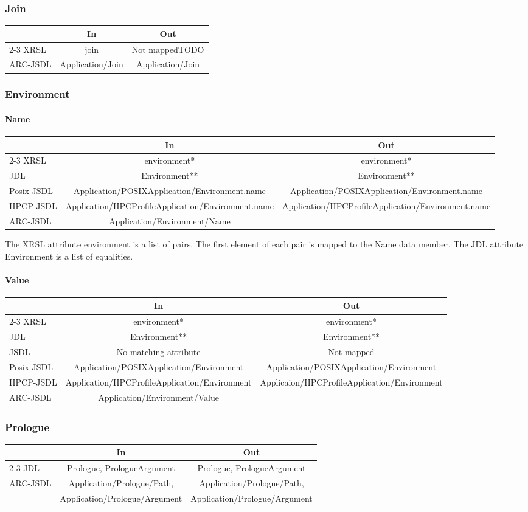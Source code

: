 \documentclass{article}
\newcommand{\todo}{TODO}
\newcommand{\subsubsubsection}[1]{\paragraph{#1}}
\newenvironment{inouttabular}%
{\begin{center}\begin{tabular}{l>{\ttfamily\footnotesize}c>{\ttfamily\footnotesize}c}%
\toprule
& \textnormal{\normalsize{In}} & \textnormal{\normalsize{Out}}\\ \cmidrule{2-3}}
{\bottomrule\end{tabular}\end{center}}
\begin{document}
\subsubsection{Join}
\begin{inouttabular}
XRSL & join & Not mapped\todo{}\\
ARC-JSDL & Application/Join & Application/Join\\
\end{inouttabular}


\subsubsection{Environment}
\subsubsubsection{Name}
\begin{inouttabular}
XRSL & environment* & environment*\\
JDL & Environment** & Environment**\\
Posix-JSDL & Application/POSIXApplication/Environment.name & Application/POSIXApplication/Environment.name\\
HPCP-JSDL & Application/HPCProfileApplication/Environment.name & Application/HPCProfileApplication/Environment.name\\
ARC-JSDL & Application/Environment/Name & ~\\
\end{inouttabular}
The XRSL attribute environment is a list of
pairs. The first element of each pair is mapped to the Name data member.
The JDL attribute Environment is a list of equalities.

\subsubsubsection{Value}
\begin{inouttabular}
XRSL & environment* & environment*\\
JDL & Environment** & Environment**\\
JSDL & No matching attribute & Not mapped\\
Posix-JSDL & Application/POSIXApplication/Environment & Application/POSIXApplication/Environment\\
HPCP-JSDL & Application/HPCProfileApplication/Environment & Applicaion/HPCProfileApplication/Environment\\
ARC-JSDL & Application/Environment/Value & ~\\
\end{inouttabular}

\subsubsection{Prologue}
\begin{inouttabular}
JDL & Prologue, PrologueArgument & Prologue, PrologueArgument\\
\multirow{2}{*}{ARC-JSDL} & Application/Prologue/Path, & Application/Prologue/Path,\\
& Application/Prologue/Argument & Application/Prologue/Argument\\
\end{inouttabular}
\end{document}
